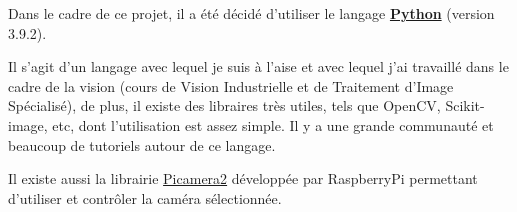Dans le cadre de ce projet, il a été décidé d'utiliser le langage \underline{\textbf{Python}} (version 3.9.2).

Il s'agit d'un langage avec lequel je suis à l'aise et avec lequel j'ai travaillé dans le cadre
de la vision (cours de Vision Industrielle et de Traitement d'Image Spécialisé), de plus, il existe des libraires très utiles, tels que
OpenCV, Scikit-image, etc, dont l'utilisation est assez simple. Il y a une grande communauté et beaucoup de tutoriels autour de ce langage.

Il existe aussi la librairie \underline{Picamera2} développée par RaspberryPi permettant d'utiliser et contrôler la caméra sélectionnée.

